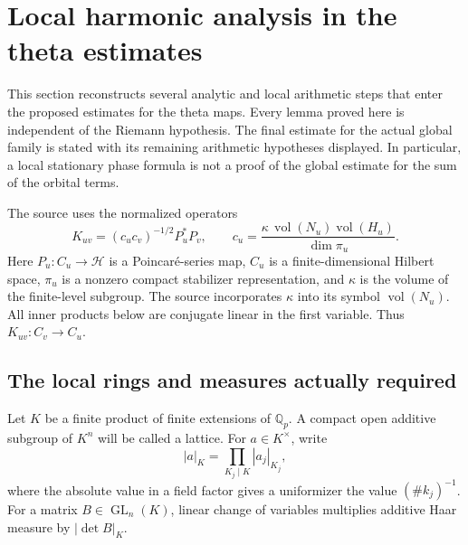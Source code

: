 \section{Local harmonic analysis in the theta estimates}
\label{sec:theta-local-audit}

This section reconstructs several analytic and local arithmetic steps that
enter the proposed estimates for the theta maps.  Every lemma proved here is
independent of the Riemann hypothesis.  The final estimate for the actual
global family is stated with its remaining arithmetic hypotheses displayed.
In particular, a local stationary phase formula is not a proof of the global
estimate for the sum of the orbital terms.

The source uses the normalized operators
\begin{equation}\label{th-normalized-K}
 K_{uv}=(c_uc_v)^{-1/2}P_u^*P_v,
 \qquad
 c_u=\frac{\kappa\,\operatorname{vol}(N_u)
                   \operatorname{vol}(H_u)}{\dim\pi_u}.
\end{equation}
Here $P_u:C_u\longrightarrow\mathcal H$ is a Poincar\'e-series map,
$C_u$ is a finite-dimensional Hilbert space, $\pi_u$ is a nonzero compact
stabilizer representation, and $\kappa$ is the volume of the finite-level
subgroup.  The source incorporates $\kappa$ into its symbol
$\operatorname{vol}(N_u)$.  All inner products below are conjugate linear
in the first variable.  Thus $K_{uv}:C_v\longrightarrow C_u$.

\subsection{The local rings and measures actually required}

Let $K$ be a finite product of finite extensions of $\mathbb Q_p$.  A
compact open additive subgroup of $K^n$ will be called a lattice.  For
$a\in K^\times$, write
\[
 |a|_K=\prod_{K_j\mid K}|a_j|_{K_j},
\]
where the absolute value in a field factor gives a uniformizer the value
$(\#k_j)^{-1}$.  For a matrix $B\in\operatorname{GL}_n(K)$,
linear change of variables multiplies additive Haar measure by
$|\det B|_K$.


